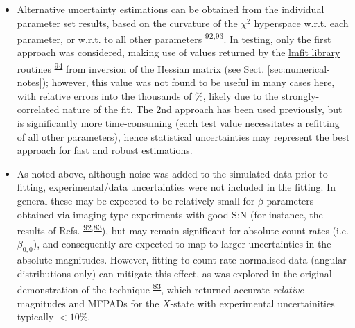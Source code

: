 \documentclass[10pt]{article}
\begin{document}
\begin{itemize}
\item Alternative uncertainty estimations can be obtained from the individual parameter set results, based on the curvature of the $\chi^2$ hyperspace w.r.t. each parameter, or w.r.t. to all other parameters \textsuperscript{\hyperref[csl:92]{92},\hyperref[csl:93]{93}}. In testing, only the first approach was considered, making use of values returned by the \href{https://lmfit.github.io/lmfit-py/fitting.html#uncertainties-in-variable-parameters-and-their-correlations}{lmfit library routines} \textsuperscript{\hyperref[csl:94]{94}} from inversion of the Hessian matrix (see Sect. \ref{sec:numerical-notes}); however, this value was not found to be useful in many cases here, with relative errors into the thousands of \%, likely due to the strongly-correlated nature of the fit. The 2nd approach has been used previously, but is significantly more time-consuming (each test value necessitates a refitting of all other parameters), hence statistical uncertainties may represent the best approach for fast and robust estimations.
\item As noted above, although noise was added to the simulated data prior to fitting, experimental/data uncertainties were not included in the fitting. In general these may be expected to be relatively small for $\beta$ parameters obtained via imaging-type experiments with good S:N (for instance, the results of Refs. \textsuperscript{\hyperref[csl:92]{92},\hyperref[csl:83]{83}}), but may remain significant for absolute count-rates (i.e. $\beta_{0,0}$), and consequently are expected to map to larger uncertainties in the absolute magnitudes. However, fitting to count-rate normalised data (angular distributions only) can mitigate this effect, as was explored in the original demonstration of the technique \textsuperscript{\hyperref[csl:83]{83}}, which returned accurate \textit{relative} magnitudes and MFPADs for the $X$-state with experimental uncertainities typically $<10\%$.
\end{itemize}




\end{document}

